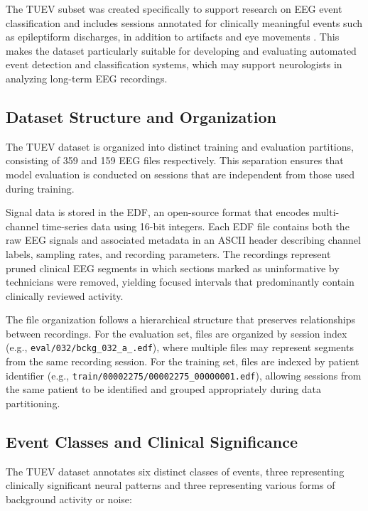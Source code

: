 The \ac{TUEV} subset was created specifically to support research on \ac{EEG} event classification and includes sessions annotated for clinically meaningful events such as epileptiform discharges, in addition to artifacts and eye movements \cite{harati2015improved}. This makes the dataset particularly suitable for developing and evaluating automated event detection and classification systems, which may support neurologists in analyzing long-term \ac{EEG} recordings.

\subsection{Dataset Structure and Organization}
\label{sec:dataset_structure}

The \ac{TUEV} dataset is organized into distinct training and evaluation partitions, consisting of 359 and 159 \ac{EEG} files respectively. This separation ensures that model evaluation is conducted on sessions that are independent from those used during training.

Signal data is stored in the \ac{EDF}, an open-source format that encodes multi-channel time-series data using 16-bit integers. Each \ac{EDF} file contains both the raw \ac{EEG} signals and associated metadata in an ASCII header describing channel labels, sampling rates, and recording parameters. The recordings represent pruned clinical \ac{EEG} segments in which sections marked as uninformative by technicians were removed, yielding focused intervals that predominantly contain clinically reviewed activity.

The file organization follows a hierarchical structure that preserves relationships between recordings. For the evaluation set, files are organized by session index (e.g., \texttt{eval/032/bckg\_032\_a\_.edf}), where multiple files may represent segments from the same recording session. For the training set, files are indexed by patient identifier (e.g., \texttt{train/00002275/00002275\_00000001.edf}), allowing sessions from the same patient to be identified and grouped appropriately during data partitioning.

\subsection{Event Classes and Clinical Significance}
\label{sec:event_classes}

The \ac{TUEV} dataset annotates six distinct classes of events, three representing clinically significant neural patterns and three representing various forms of background activity or noise:

